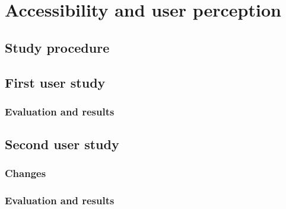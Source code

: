 
\chapter{Accessibility and user perception}\label{chapter:userstudy}

\section{Study procedure}

\section{First user study}
\subsection{Evaluation and results}

\section{Second user study}
\subsection{Changes}
\subsection{Evaluation and results}